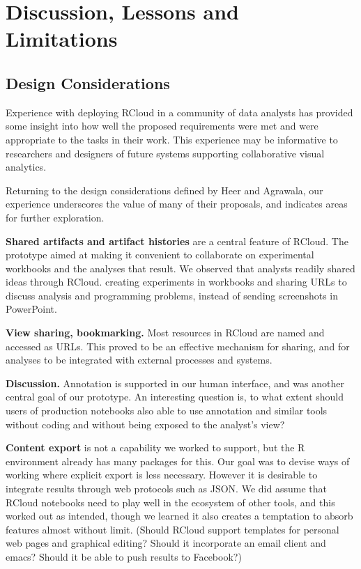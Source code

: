 \section{Discussion, Lessons and Limitations}

\subsection{Design Considerations}

Experience with deploying RCloud in a community of data analysts
has provided some insight into how well the proposed requirements
were met and were appropriate to the tasks in their work.
This experience may be informative to researchers and designers
of future systems supporting collaborative visual analytics.

Returning to the design considerations defined by Heer and Agrawala,
our experience underscores the value of many of their proposals,
and indicates areas for further exploration.

{\bf Shared artifacts and artifact histories} are a central feature
of RCloud. The prototype aimed at making it convenient to collaborate
on experimental workbooks and the analyses that result. We observed
that analysts readily shared ideas through RCloud. 
creating experiments
in workbooks and sharing URLs to discuss analysis and programming
problems, instead of sending screenshots in PowerPoint.

{\bf View sharing, bookmarking.} Most resources in RCloud are named
and accessed as URLs. This proved to be an effective mechanism
for sharing, and for analyses to be integrated with
external processes and systems.

{\bf Discussion.} Annotation is supported in our human interface,
and was another central goal of our prototype. 
An interesting question is, to what extent should users of production
notebooks also able to use annotation and similar tools without coding
and without being exposed to the analyst's view?

{\bf Content export} is not a capability we worked to support,
but the R environment already has many packages for this.
Our goal was to devise ways of working where explicit export
is less necessary. However it is desirable to integrate results
through web protocols such as JSON. We did assume that RCloud
notebooks need to play well in the ecosystem of other tools,
and this worked out as intended, though we learned it also creates
a temptation to absorb features almost without limit. (Should
RCloud support templates for personal web pages and graphical
editing? Should it incorporate an email client and emacs?
Should it be able to push results to Facebook?)


